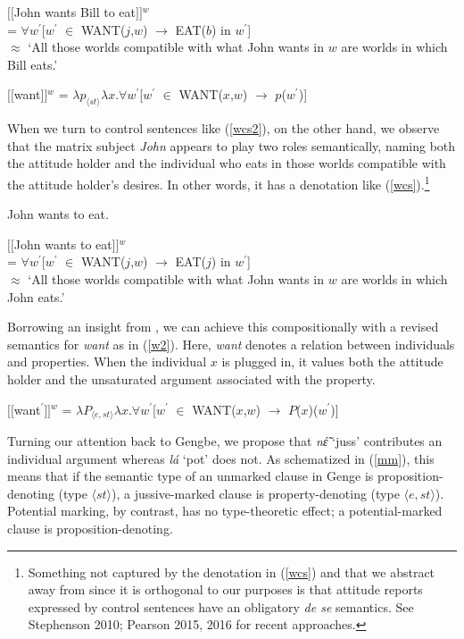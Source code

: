 \documentclass[output=paper
,modfonts
,nonflat]{langsci/langscibook}
\def\denotes#1{$\lbrack\!\lbrack${#1\/}$\rbrack\!\rbrack$}      %
\newcommand{\á}{\'{ã}}
\newcommand{\É}{\'{\~{ε}}}
\newcommand{\È}{\`{\~{ε}}}
\newcommand{\í}{\'{\~{i}}}
\newcommand{\ì}{\`{\~{i}}}
\newcommand{\Ó}{\'{\~{ɔ}}}
\newcommand{\Ò}{\`{\~{ɔ}}}
\newcommand{\ú}{\'{ũ}}
\newcommand{\ù}{\`{ũ}}
\begin{document}
\ea 
\denotes{John wants Bill to eat}$^{w}$\\ = $\forall w^{\prime}$[$w^{\prime}$ $\in$ WANT($j$,$w$) $\rightarrow$ EAT($b$) in $w^{\prime}$]\\
$\approx$ `All those worlds compatible with what John wants in $w$ are worlds in which Bill eats.' \label{ws}
\z

\ea 
\denotes{want}$^{w}$ = $\lambda p_{\langle st\rangle}\lambda x.\forall w^{\prime}$[$w^{\prime}$ $\in$ WANT($x$,$w$) $\rightarrow$ $p$($w^{\prime}$)] \label{w}
\z

When we turn to control sentences like (\ref{wcs2}), on the other hand, we observe that the matrix subject {\em John} appears to play two roles semantically, naming both the attitude holder and the individual who eats in those worlds compatible with the attitude holder's desires. In other words, it has a denotation like (\ref{wcs}).\footnote{Something not captured by the denotation in (\ref{wcs}) and that we abstract away from since it is orthogonal to our purposes is that attitude reports expressed by control sentences have an obligatory {\em de se} semantics. See Stephenson 2010; Pearson 2015, 2016 for recent approaches.\nocite{stephenson10, pearson15, pearson16}}

\ea 
John wants to eat. \label{wcs2}
\z

\ea 
\denotes{John wants to eat}$^{w}$\\  = $\forall w^{\prime}$[$w^{\prime}$ $\in$ WANT($j$,$w$) $\rightarrow$ EAT($j$) in $w^{\prime}$]\\
$\approx$ `All those worlds compatible with what John wants in $w$ are worlds in which John eats.' \label{wcs}
\z

Borrowing an insight from \cite{chierchia84, dowty85}, we can achieve this compositionally with a revised semantics for {\em want} as in (\ref{w2}). Here, {\em want} denotes a relation between individuals and properties. When the individual $x$ is plugged in, it values both the attitude holder and the unsaturated argument associated with the property.

\ea
\denotes{want$^{\prime}$}$^{w}$ = $\lambda P_{\langle  e, st\rangle}\lambda x.\forall w^{\prime}$[$w^{\prime}$ $\in$ WANT($x$,$w$) $\rightarrow$ $P$($x$)($w^{\prime}$)] \label{w2}
\z

Turning our attention back to Gengbe, we propose that {\em n{\É}} `{\sc juss}' contributes an individual argument whereas {\em l\'a} `{\sc pot}' does not. As schematized in (\ref{mm}), this means that if the semantic type of an unmarked clause in Genge is proposition-denoting (type $\langle st\rangle$), a jussive-marked clause is property-denoting (type $\langle e,st\rangle$). Potential marking, by contrast, has no type-theoretic effect; a potential-marked clause is proposition-denoting. 
\end{document}
